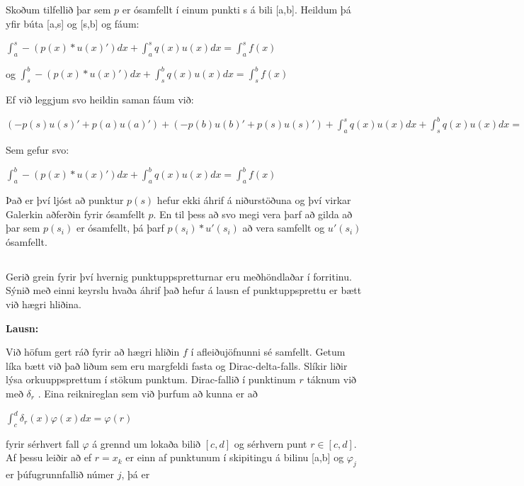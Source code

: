 \documentclass[11pt,a4paper,titlepage]{article}
\begin{document}
Skoðum tilfellið þar sem $p$ er ósamfellt í einum punkti s á bili [a,b].
Heildum þá yfir búta [a,s] og [s,b] og fáum:\par
\begin{center}
	$\int_{a}^{s}-(p(x)*u{(x)}')dx + \int_{a}^{s}q(x)u(x)dx= \int_{a}^{s}f(x)$ \par
	og $\int_{s}^{b}-(p(x)*u{(x)}')dx + \int_{s}^{b}q(x)u(x)dx= \int_{s}^{b}f(x)$
\end{center}
Ef við leggjum svo heildin saman fáum við:\par
\begin{center}
	$(-p(s)u{(s)}'+p(a)u{(a)}')+(-p(b)u{(b)}'+p(s)u{(s)}')+ \int_{a}^{s}q(x)u(x)dx+ \int_{s}^{b}q(x)u(x)dx =\int_{a}^{s}f(x)+\int_{s}^{b}f(x)$
\end{center}
Sem gefur svo: 
\begin{center}
	$\int_{a}^{b}-(p(x)*u{(x)}')dx + \int_{a}^{b}q(x)u(x)dx= \int_{a}^{b}f(x)$
\end{center} \par
Það er því ljóst að punktur $p(s)$ hefur ekki áhrif á niðurstöðuna og því virkar Galerkin aðferðin fyrir ósamfellt $p$. 
En til þess að svo megi vera þarf að gilda að þar sem $p(s_{i})$ er ósamfellt, þá þarf $p(s_{i})*u'(s_{i})$ að vera samfellt og $u'(s_{i})$ ósamfellt.


\subsection{}
Gerið grein fyrir því hvernig punktuppspretturnar eru meðhöndlaðar í forritinu. Sýnið með einni keyrslu hvaða áhrif það hefur á lausn ef punktuppsprettu er bætt við hægri hliðina. 

\par
\textbf{Lausn:} \par
Við höfum gert ráð fyrir að hægri hliðin $f$ í afleiðujöfnunni sé samfellt. Getum líka bætt við það liðum sem eru margfeldi fasta og Dirac-delta-falls. Slíkir liðir lýsa orkuuppsprettum í stökum punktum.  Dirac-fallið í punktinum $r$ táknum við með $\delta _{r}$ . Eina reiknireglan sem við þurfum að kunna er að 

\begin{center}$\int_{c}^{d}\delta _{r}(x) \varphi (x)dx=\varphi(r)$\end{center}

fyrir sérhvert fall $\varphi$ á grennd um lokaða bilið $[c,d]$ og sérhvern punt $r\in[c,d]$. Af þessu leiðir að ef $r=x_{k}$ er einn af punktunum í skipitingu á bilinu [a,b] og $\varphi_{j}$ er þúfugrunnfallið númer $j$, þá er 
\end{document}
